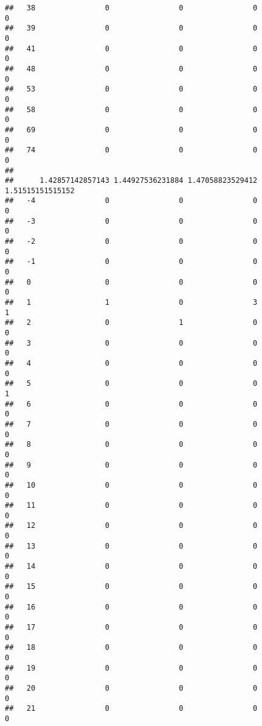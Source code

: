 \documentclass[]{article}
\begin{document}
\begin{verbatim}
##   38                0                0                0                0
##   39                0                0                0                0
##   41                0                0                0                0
##   48                0                0                0                0
##   53                0                0                0                0
##   58                0                0                0                0
##   69                0                0                0                0
##   74                0                0                0                0
##     
##      1.42857142857143 1.44927536231884 1.47058823529412 1.51515151515152
##   -4                0                0                0                0
##   -3                0                0                0                0
##   -2                0                0                0                0
##   -1                0                0                0                0
##   0                 0                0                0                0
##   1                 1                0                3                1
##   2                 0                1                0                0
##   3                 0                0                0                0
##   4                 0                0                0                0
##   5                 0                0                0                1
##   6                 0                0                0                0
##   7                 0                0                0                0
##   8                 0                0                0                0
##   9                 0                0                0                0
##   10                0                0                0                0
##   11                0                0                0                0
##   12                0                0                0                0
##   13                0                0                0                0
##   14                0                0                0                0
##   15                0                0                0                0
##   16                0                0                0                0
##   17                0                0                0                0
##   18                0                0                0                0
##   19                0                0                0                0
##   20                0                0                0                0
##   21                0                0                0                0

\end{verbatim}
\end{document}
